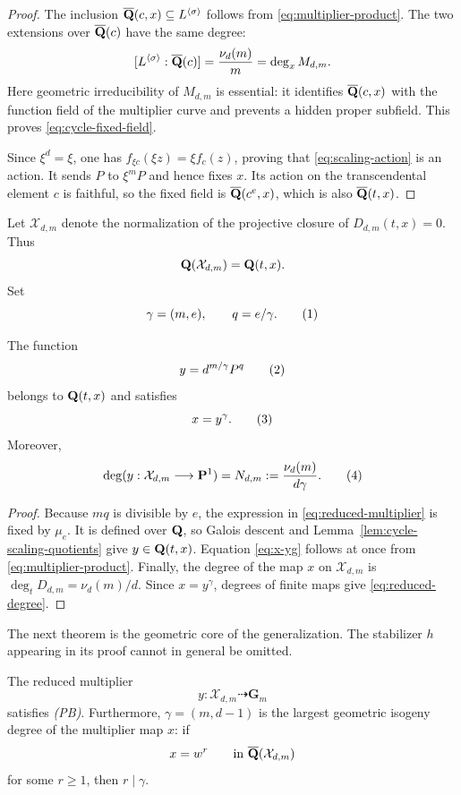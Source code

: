 \begin{proof}
The inclusion $\overline{\mathbf Q}(c,x)\subseteq L^{\langle\sigma\rangle}$
follows from \eqref{eq:multiplier-product}.  The two extensions over
$\overline{\mathbf Q}(c)$ have the same degree:
\[
 [L^{\langle\sigma\rangle}:\overline{\mathbf Q}(c)]
 =\frac{\nu_d(m)}m
 =\deg_x M_{d,m}.
\]
Here geometric irreducibility of $M_{d,m}$ is essential: it identifies
$\overline{\mathbf Q}(c,x)$ with the function field of the multiplier curve and
prevents a hidden proper subfield.  This proves
\eqref{eq:cycle-fixed-field}.

Since $\xi^d=\xi$, one has
$f_{\xi c}(\xi z)=\xi f_c(z)$, proving that
\eqref{eq:scaling-action} is an action.  It sends
$P$ to $\xi^mP$ and hence fixes $x$.  Its action on the transcendental
element $c$ is faithful, so the fixed field is
$\overline{\mathbf Q}(c^e,x)$, which is also $\overline{\mathbf Q}(t,x)$.
\end{proof}

Let $\mathcal X_{d,m}$ denote the normalization of the projective
closure of $D_{d,m}(t,x)=0$.  Thus
\[
 \mathbf Q(\mathcal X_{d,m})=\mathbf Q(t,x).
\]
Set
\[
 \gamma=(m,e),\qquad q=e/\gamma.
 \numberthis\label{eq:gq-definition}
\]

\begin{proposition}
\label{prop:reduced-multiplier}
The function
\[
 y=d^{m/\gamma}P^q
 \numberthis\label{eq:reduced-multiplier}
\]
belongs to $\mathbf Q(t,x)$ and satisfies
\[
 x=y^\gamma.
 \numberthis\label{eq:x-yg}
\]
Moreover,
\[
 \deg(y:\mathcal X_{d,m}\longrightarrow\mathbf P^1)
 =N_{d,m}:=\frac{\nu_d(m)}{d\gamma}.
 \numberthis\label{eq:reduced-degree}
\]
\end{proposition}

\begin{proof}
Because $mq$ is divisible by $e$, the expression in
\eqref{eq:reduced-multiplier} is fixed by $\mu_e$.  It is defined over
$\mathbf Q$, so Galois descent and Lemma~\ref{lem:cycle-scaling-quotients}
give $y\in\mathbf Q(t,x)$.  Equation \eqref{eq:x-yg} follows at once from
\eqref{eq:multiplier-product}.  Finally, the degree of the map $x$ on
$\mathcal X_{d,m}$ is $\deg_tD_{d,m}=\nu_d(m)/d$.  Since $x=y^\gamma$,
degrees of finite maps give \eqref{eq:reduced-degree}.
\end{proof}

The next theorem is the geometric core of the generalization.  The
stabilizer $h$ appearing in its proof cannot in general be omitted.

\begin{theorem}
\label{thm:unicritical-pb}
The reduced multiplier
\[
 y:\mathcal X_{d,m}\dashrightarrow\mathbf G_m
\]
satisfies \emph{(PB)}.  Furthermore, $\gamma=(m,d-1)$ is the largest
geometric isogeny degree of the multiplier map $x$: if
\[
 x=w^r\qquad\text{in }\overline{\mathbf Q}(\mathcal X_{d,m})
\]
for some $r\ge1$, then $r\mid\gamma$.
\end{theorem}

